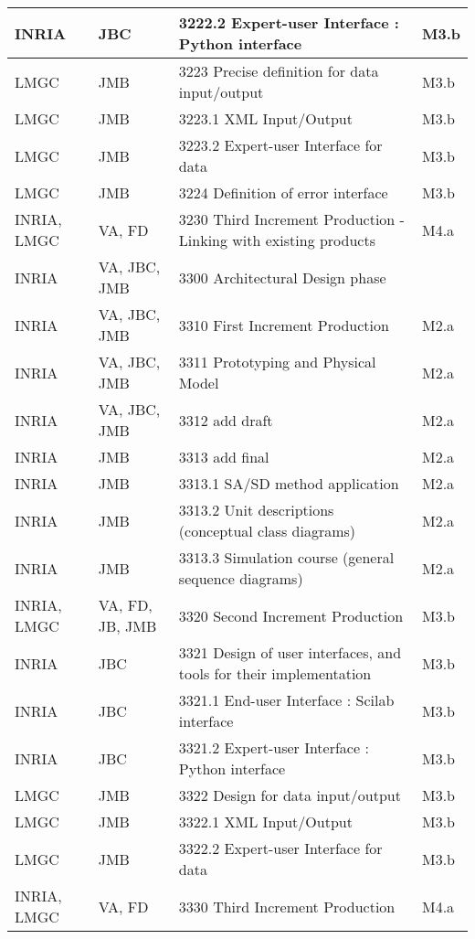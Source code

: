 \begin{longtable}{|l|l|l|l|}
  INRIA & JBC &   3222.2 Expert-user Interface : Python interface & M3.b \\ \hline
  LMGC & JMB &   3223 Precise definition for data input/output  & M3.b \\ \hline
  LMGC & JMB &  3223.1 XML Input/Output & M3.b \\ \hline
  LMGC & JMB &  3223.2 Expert-user Interface for data & M3.b \\ \hline
  LMGC & JMB &   3224 Definition of error interface                     & M3.b \\ \hline
  INRIA, LMGC & VA, FD &   3230 Third Increment Production - Linking with existing products  & M4.a \\ \hline
  INRIA & VA, JBC, JMB &   3300 Architectural Design phase      &  \\ \hline
  INRIA & VA, JBC, JMB &   3310 First Increment Production      & M2.a \\ \hline
  INRIA & VA, JBC, JMB &   3311 Prototyping and Physical Model  & M2.a \\ \hline
  INRIA & VA, JBC, JMB &   3312 \ac{add} draft          & M2.a \\ \hline
  INRIA & JMB &   3313 \ac{add} final  & M2.a \\ \hline
  INRIA & JMB &   3313.1 SA/SD method application  & M2.a \\ \hline
  INRIA & JMB &   3313.2 Unit descriptions (conceptual class diagrams)  & M2.a \\ \hline
  INRIA & JMB &   3313.3 Simulation course (general sequence diagrams)  & M2.a \\ \hline
  INRIA, LMGC &  VA, FD, JB, JMB &   3320 Second Increment Production   & M3.b \\ \hline
  INRIA & JBC &  3321 Design of user interfaces, and tools for their implementation & M3.b \\ \hline        
  INRIA & JBC &  3321.1 End-user Interface : Scilab interface   & M3.b \\ \hline
  INRIA & JBC &  3321.2 Expert-user Interface : Python interface  & M3.b \\ \hline
  LMGC & JMB & 3322 Design for data input/output & M3.b \\ \hline       
  LMGC & JMB & 3322.1 XML Input/Output & M3.b \\ \hline
  LMGC & JMB & 3322.2 Expert-user Interface for data & M3.b \\ \hline
  INRIA, LMGC &  VA, FD &   3330 Third Increment Production    & M4.a \\ \hline

\end{longtable}
